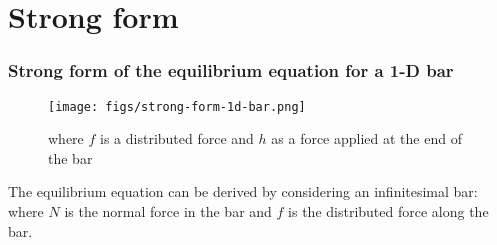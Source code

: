 \documentclass[notes]{beamer}
\begin{document}
\section{Strong form}

\begin{frame}
\frametitle{Strong form of the equilibrium equation for a 1-D bar}
\begin{figure}
	\texttt{[image: figs/strong-form-1d-bar.png]}
	\caption*{where $f$ is a distributed force and $h$ as a force applied at the end of the bar}
\end{figure}
The equilibrium equation can be derived by considering an infinitesimal bar: 
where $N$ is the normal force in the bar and $f$ is the distributed force along the bar.
\end{frame}
\end{document}
